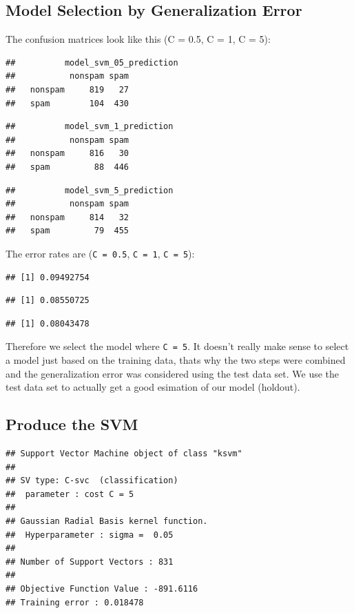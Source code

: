 \documentclass[]{article}
\begin{document}
\subsection{Model Selection by Generalization
Error}\label{model-selection-by-generalization-error}

The confusion matrices look like this (C = 0.5, C = 1, C = 5):

\begin{verbatim}
##          model_svm_05_prediction
##           nonspam spam
##   nonspam     819   27
##   spam        104  430
\end{verbatim}

\begin{verbatim}
##          model_svm_1_prediction
##           nonspam spam
##   nonspam     816   30
##   spam         88  446
\end{verbatim}

\begin{verbatim}
##          model_svm_5_prediction
##           nonspam spam
##   nonspam     814   32
##   spam         79  455
\end{verbatim}

The error rates are (\texttt{C\ =\ 0.5}, \texttt{C\ =\ 1},
\texttt{C\ =\ 5}):

\begin{verbatim}
## [1] 0.09492754
\end{verbatim}

\begin{verbatim}
## [1] 0.08550725
\end{verbatim}

\begin{verbatim}
## [1] 0.08043478
\end{verbatim}

Therefore we select the model where \texttt{C\ =\ 5}. It doesn't really
make sense to select a model just based on the training data, thats why
the two steps were combined and the generalization error was considered
using the test data set. We use the test data set to actually get a good
esimation of our model (holdout).

\subsection{Produce the SVM}\label{produce-the-svm}

\begin{verbatim}
## Support Vector Machine object of class "ksvm" 
## 
## SV type: C-svc  (classification) 
##  parameter : cost C = 5 
## 
## Gaussian Radial Basis kernel function. 
##  Hyperparameter : sigma =  0.05 
## 
## Number of Support Vectors : 831 
## 
## Objective Function Value : -891.6116 
## Training error : 0.018478
\end{verbatim}
\end{document}

